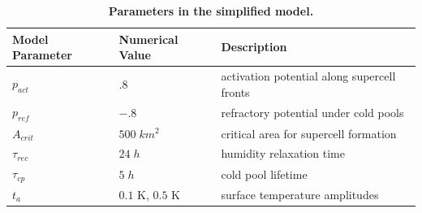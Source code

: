 \documentclass{article}
\begin{document}
\begin{methods}
\begin{table}[b]
\begin{tabular}{lll}
    Model Parameter & Numerical Value & Description \\
    \hline
    $p_{act}$ & $.8$ & activation potential along supercell fronts \\ 
    $p_{ref}$ & $-.8$ & refractory potential under cold pools\\
    $A_{crit}$ & $500\;km^2$ & critical area for supercell formation \\
    $\tau_{rec}$ & $24\;h$ & humidity relaxation time \\ 
    $\tau_{cp}$ & $5\;h$ & cold pool lifetime \\ 
    $t_a$ & $0.1$ K, $0.5$ K & surface temperature amplitudes \\
    \hline
\end{tabular}
\caption{{\bf Parameters in the simplified model.}}
\label{tab:parameters}
\end{table}


\end{methods}
\end{document}
